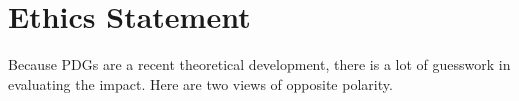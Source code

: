 \documentclass[letterpaper]{article} %
\theoremstyle{plain}
\theoremstyle{definition}
\theoremstyle{remark}
\newcommand{\todo}[1]{{\color{red}\ \!\Large\smash{\textbf{[}}{\normalsize\textsc{todo:} #1}\ \!\smash{\textbf{]}}}}
\begin{document}
	
\clearpage
	\section*{Ethics Statement}
Because PDGs are a recent theoretical development, there is a lot of
guesswork in evaluating the impact. Here are two views of
opposite polarity.
\end{document}
